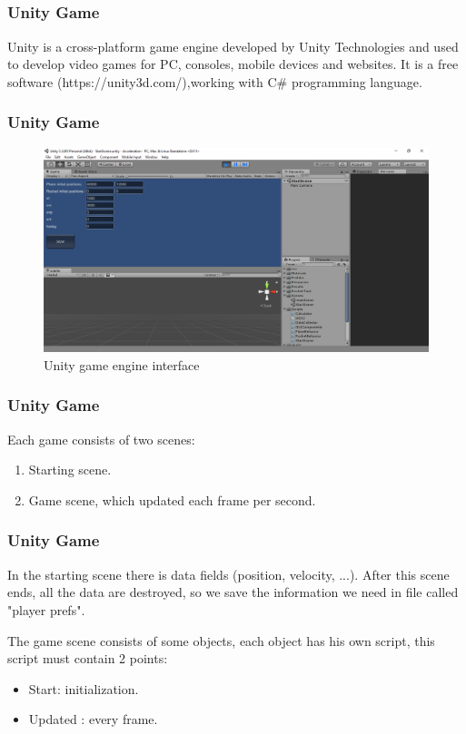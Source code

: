\documentclass{beamer}
\begin{document}
\subsection{}
\begin{frame}
\frametitle{Unity Game}
Unity is a cross-platform game engine developed by Unity Technologies and used to develop video games for PC, consoles, mobile devices and websites. It is a free software (https://unity3d.com/),working with C\# programming language. 
\end{frame}
\begin{frame}
\frametitle{Unity Game}
\begin{figure}[H]
	\centering
	\includegraphics[scale = 0.2]{fig/unityInterface.PNG}
	\caption{Unity game engine interface }
	\label{UnityInterface}
\end{figure}
\end{frame}
\begin{frame}
\frametitle{Unity Game}
Each game consists of two scenes:
\begin{enumerate}
	\item Starting scene.
	\item Game scene, which updated each frame per second.
\end{enumerate}
\end{frame}
\begin{frame}
\frametitle{Unity Game}
In the starting scene there is data fields (position, velocity, ...). After this scene ends, all the data are destroyed, so we save the information we need in file called "player prefs".

The game scene consists of some objects, each object has his own script, this script must contain 2 points:
\begin{itemize}
	\item Start: initialization.
	\item Updated : every frame.
\end{itemize} 
\end{frame}
\end{document}
